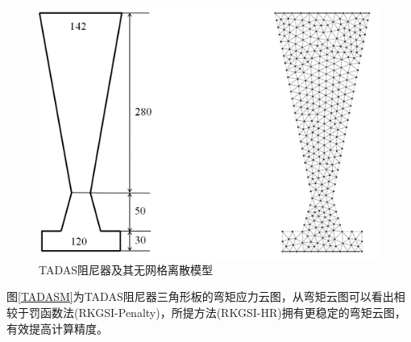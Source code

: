 \begin{figure}[H]
    \centering
    \includegraphics[scale=0.6]{figure/DAMPER/TADAS/TADAS dampers_msh.png}
    \caption{TADAS阻尼器及其无网格离散模型}\label{TADASmsh}
\end{figure}
图\ref{TADASM}为TADAS阻尼器三角形板的弯矩应力云图，从弯矩云图可以看出相较于罚函数法(RKGSI-Penalty)，所提方法(RKGSI-HR)拥有更稳定的弯矩云图，有效提高计算精度。

